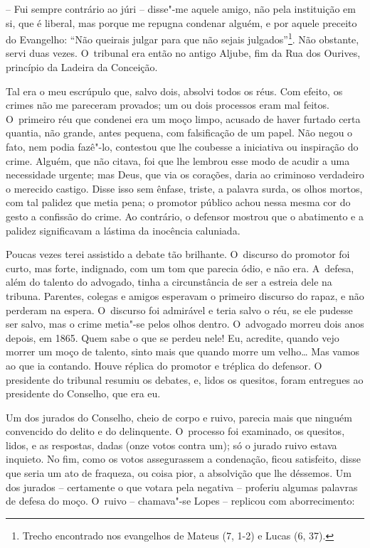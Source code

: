 -- Fui sempre contrário ao júri -- disse"-me aquele amigo, não pela
instituição em si, que é liberal, mas porque me repugna condenar alguém,
e por aquele preceito do Evangelho: ``Não queirais julgar para que não
sejais julgados''\footnote{Trecho encontrado nos evangelhos de Mateus
  (7, 1-2) e Lucas (6, 37).}. Não obstante, servi duas vezes. O~tribunal
era então no antigo Aljube, fim da Rua dos Ourives, princípio da Ladeira
da Conceição.

Tal era o meu escrúpulo que, salvo dois, absolvi todos os réus. Com
efeito, os crimes não me pareceram provados; um ou dois processos eram
mal feitos. O~primeiro réu que condenei era um moço limpo, acusado de
haver furtado certa quantia, não grande, antes pequena, com falsificação
de um papel. Não negou o fato, nem podia fazê"-lo, contestou que lhe
coubesse a iniciativa ou inspiração do crime. Alguém, que não citava,
foi que lhe lembrou esse modo de acudir a uma necessidade urgente; mas
Deus, que via os corações, daria ao criminoso verdadeiro o merecido
castigo. Disse isso sem ênfase, triste, a palavra surda, os olhos
mortos, com tal palidez que metia pena; o promotor público achou nessa
mesma cor do gesto a confissão do crime. Ao contrário, o defensor
mostrou que o abatimento e a palidez significavam a lástima da inocência
caluniada.

Poucas vezes terei assistido a debate tão brilhante. O~discurso do
promotor foi curto, mas forte, indignado, com um tom que parecia ódio, e
não era. A~defesa, além do talento do advogado, tinha a circunstância de
ser a estreia dele na tribuna. Parentes, colegas e amigos esperavam o
primeiro discurso do rapaz, e não perderam na espera. O~discurso foi
admirável e teria salvo o réu, se ele pudesse ser salvo, mas o crime
metia"-se pelos olhos dentro. O~advogado morreu dois anos depois, em
1865. Quem sabe o que se perdeu nele! Eu, acredite, quando vejo morrer
um moço de talento, sinto mais que quando morre um velho\ldots{} Mas vamos ao
que ia contando. Houve réplica do promotor e tréplica do defensor. O
presidente do tribunal resumiu os debates, e, lidos os quesitos, foram
entregues ao presidente do Conselho, que era eu.

Um dos jurados do Conselho, cheio de corpo e ruivo, parecia mais que
ninguém convencido do delito e do delinquente. O~processo foi examinado,
os quesitos, lidos, e as respostas, dadas (onze votos contra um); só o
jurado ruivo estava inquieto. No fim, como os votos assegurassem a
condenação, ficou satisfeito, disse que seria um ato de fraqueza, ou
coisa pior, a absolvição que lhe déssemos. Um dos jurados -- certamente
o que votara pela negativa -- proferiu algumas palavras de defesa do
moço. O~ruivo -- chamava"-se Lopes -- replicou com aborrecimento:

